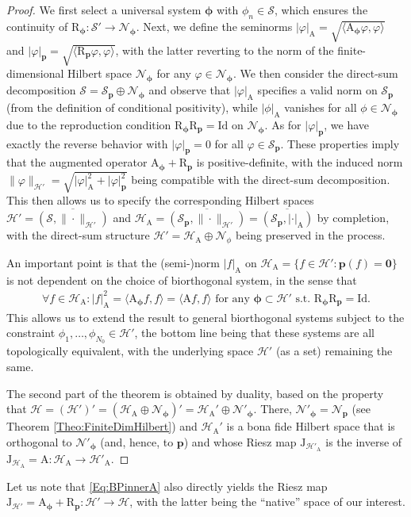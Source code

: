 \documentclass[11pt, english,english]{article}
\def\V#1{{\boldsymbol{#1}}}         %
\def\Spc#1{{\mathcal{#1}}}  %
\def\Op#1{{\mathrm{#1}}}  %
\def\Identity{\mathrm{Id}} %
\renewcommand{\[}{\begin{equation}}
\renewcommand{\]}[1]{\label{eq:#1}\end{equation}}
\begin{document}
\begin{proof}[\small Proof]
{\small
We first select a universal system $\V \phi$ with $\phi_n \in \Spc S$, which ensures the continuity of
$\Op R_{\V \phi}: \Spc S' \to \Spc N_{\V \phi}$. Next, we define the seminorms $|\varphi|_{\Op A}=\sqrt{\langle \Op A_{\V \phi}\varphi,\varphi\rangle}$ and $|\varphi |_{\V p}=\sqrt{\langle \Op R_{\V p}\varphi,\varphi\rangle}$, with the latter reverting to the norm of the finite-dimensional Hilbert space $\Spc N_{\V \phi}$ for any $\varphi \in \Spc N_{\V \phi}$.
We then consider the direct-sum decomposition
$\Spc S=\Spc S_{\V p} \oplus \Spc N_{\V \phi}$ and observe that $|\varphi|_{\Op A}$ specifies a valid norm on
$\Spc S_{\V p}$ (from the definition of conditional positivity), while $|\phi|_{\Op A}$ vanishes for all $\phi \in \Spc N_{\V \phi}$ due to the reproduction condition $\Op R_{\V \phi}\Op R_\V p=\Identity$ on $\Spc N_{\V \phi}$. As for $|\varphi|_{\V p}$, we have exactly the reverse behavior with $|\varphi|_{\V p}=0$ for all $\varphi \in \Spc S_{\V p}$. These properties imply that
the augmented operator $\Op A_{\V \phi} + \Op R_{\V p}$ is positive-definite, with the induced norm
$\|\varphi\|_{\Spc H'}=\sqrt{|\varphi|^2_{\Op A}+|\varphi|^2_{\V p}}$ being compatible with the direct-sum decomposition.
This then allows us to specify the corresponding Hilbert spaces $\Spc H'=\overline{(\Spc S,\|\cdot\|_{\Spc H'})}$ and $\Spc H_{\Op A}=\overline{(\Spc S_{\V p},\|\cdot\|_{\Spc H'})}=\overline{(\Spc S_{\V p},|\cdot|_{\Op A})}$ by completion, with the direct-sum structure $\Spc H'=\Spc H_{\Op A} \oplus \Spc N_{\phi}$ being preserved in the process. 

An important point is that the (semi-)norm $|f|_{\Op A}$ on $\Spc H_{\Op A}=\{f \in \Spc H': \V p(f)=\V 0\}$ is not dependent on the choice of biorthogonal system, in the sense that
\begin{align}
\forall f \in \Spc H_{\Op A}: |f|^2_{\Op A}=\langle \Op A_{\V \phi} f, f\rangle=  \langle \Op A f, f\rangle \mbox{ for any } \V \phi \subset \Spc H' \mbox{ s.t. } \Op R_{\V \phi}\Op R_{\V p}=\Identity.
\end{align}
This allows us to extend the result to general biorthogonal systems subject to the constraint $\phi_1, \dots, \phi_{N_0} \in \Spc H'$, the bottom line being that these systems are all topologically equivalent,
with the underlying space $\Spc H'$ (as a set) remaining the same.

The second part of the theorem is obtained by duality, based on the property that 
$\Spc H=(\Spc H')'=(\Spc H_\Op A \oplus \Spc N_{\V \phi})'=\Spc H_\Op A' \oplus \Spc N'_{\V \phi}$. There, $\Spc N'_{\V \phi}=\Spc N_{\V p}$ (see Theorem \ref{Theo:FiniteDimHilbert}) and $\Spc H_\Op A'$ is a bona fide Hilbert space that is orthogonal to $\Spc N'_{\V \phi}$ (and, hence, to $\V p$) and whose Riesz map  $\Op J_{\Spc H'_\Op A}$ is the inverse of $\Op J_{\Spc H_\Op A}=\Op A: \Spc H_\Op A \to \Spc H'_\Op A$.
} %
\end{proof}
Let us note that \eqref{Eq:BPinnerA} also directly yields the Riesz map $\Op J_{\Spc H'}=\Op A_{\V \phi} + \Op R_{\V p}:
\Spc H' \to \Spc H$, with the latter being the ``native'' space of our interest.
\end{document}
